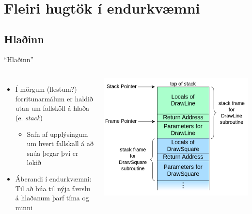 \documentclass[handout]{beamer}
\begin{document}
\section{Fleiri hugtök í endurkvæmni}

\subsection{Hlaðinn}

\begin{frame}{``Hlaðinn''}
\begin{columns}
\begin{itemize}
 \item Í mörgum (flestum?) forritunarmálum er haldið utan um fallsköll á hlaða (e. \emph{stack})
 \begin{itemize}
  \item Safn af upplýsingum um hvert fallskall á að snúa þegar því er lokið
 \end{itemize}
 \item Áberandi í endurkvæmni: Til að búa til nýja færslu á hlaðanum þarf tíma og minni
\end{itemize}
\includegraphics[width=\linewidth]{Pics/call-stack}
\end{columns}

\end{frame}
\end{document}
